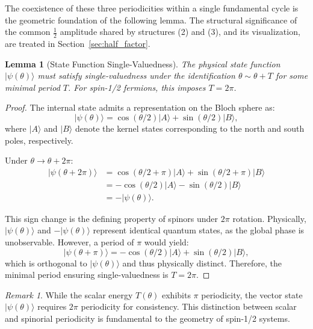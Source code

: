 \documentclass[%
 reprint,
 amsmath,amssymb,
 aps,
 prb,
]{revtex4-2}
\numberwithin{equation}{section}
\newtheorem{lemma}[theorem]{Lemma}
\theoremstyle{definition}
\theoremstyle{remark}
\newtheorem{remark}{Remark}[section]
\begin{document}
The coexistence of these three periodicities within a single fundamental cycle is the geometric foundation of the following lemma. The structural significance of the common $\frac{1}{2}$ amplitude shared by structures (2) and (3), and its visualization, are treated in Section~\ref{sec:half_factor}.

\begin{lemma}[State Function Single-Valuedness]
\label{lem:single_valued}
The physical state function $|\psi(\theta)\rangle$ must satisfy single-valuedness under the identification $\theta \sim \theta + T$ for some minimal period $T$. For spin-1/2 fermions, this imposes $T = 2\pi$.
\end{lemma}

\begin{proof}
The internal state admits a representation on the Bloch sphere as:
\begin{equation}
|\psi(\theta)\rangle = \cos(\theta/2)|A\rangle + \sin(\theta/2)|B\rangle,
\label{eq:state_real}
\end{equation}
where $|A\rangle$ and $|B\rangle$ denote the kernel states corresponding to the north and south poles, respectively.

Under $\theta \to \theta + 2\pi$:
\begin{align}
|\psi(\theta + 2\pi)\rangle &= \cos(\theta/2 + \pi)|A\rangle + \sin(\theta/2 + \pi)|B\rangle \nonumber \\
&= -\cos(\theta/2)|A\rangle - \sin(\theta/2)|B\rangle \nonumber \\
&= -|\psi(\theta)\rangle.
\label{eq:spinor_periodicity}
\end{align}

This sign change is the defining property of spinors under $2\pi$ rotation. Physically, $|\psi(\theta)\rangle$ and $-|\psi(\theta)\rangle$ represent identical quantum states, as the global phase is unobservable. However, a period of $\pi$ would yield:
\begin{equation}
|\psi(\theta + \pi)\rangle = -\cos(\theta/2)|A\rangle + \sin(\theta/2)|B\rangle,
\label{eq:pi_shift}
\end{equation}
which is orthogonal to $|\psi(\theta)\rangle$ and thus physically distinct. Therefore, the minimal period ensuring single-valuedness is $T = 2\pi$.
\end{proof}

\begin{remark}
While the scalar energy $T(\theta)$ exhibits $\pi$ periodicity, the vector state $|\psi(\theta)\rangle$ requires $2\pi$ periodicity for consistency. This distinction between scalar and spinorial periodicity is fundamental to the geometry of spin-1/2 systems.
\end{remark}
\end{document}
